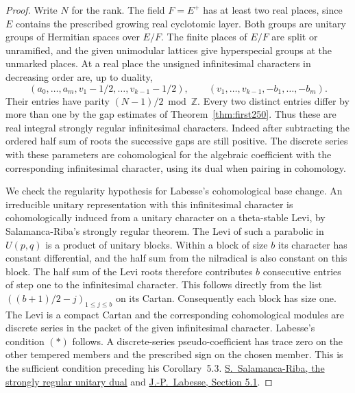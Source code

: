 \documentclass[a4paper,11pt]{article}
\theoremstyle{definition}
\theoremstyle{remark}
\newcommand{\ZZ}{\mathbb Z}\newcommand{\ord}{\operatorname{ord}}
\numberwithin{equation}{section}
\begin{document}
\begin{proof}
Write \(N\) for the rank. The field \(F=E^+\) has at least two
real places, since \(E\) contains the prescribed growing real
cyclotomic layer. Both groups are unitary groups of Hermitian
spaces over \(E/F\). The finite places of \(E/F\) are split or
unramified, and the given unimodular lattices give hyperspecial
groups at the unmarked places. At a real place the unsigned
infinitesimal characters in decreasing order are, up to duality,
\[
 (a_0,\ldots,a_m,v_1-1/2,\ldots,v_{k-1}-1/2),\qquad
 (v_1,\ldots,v_{k-1},-b_1,\ldots,-b_m).
\]
Their entries have parity \((N-1)/2\bmod\ZZ\). Every two distinct
entries differ by more than one by the gap estimates of
Theorem~\ref{thm:first250}. Thus these are real integral strongly
regular infinitesimal characters. Indeed after subtracting the
ordered half sum of roots the successive gaps are still positive.
The discrete series with these parameters are cohomological for
the algebraic coefficient with the corresponding infinitesimal
character, using its dual when pairing in cohomology.

We check the regularity hypothesis for Labesse's cohomological
base change. An irreducible unitary representation with this
infinitesimal character is cohomologically induced from a unitary
character on a theta-stable Levi, by Salamanca-Riba's strongly
regular theorem. The Levi of such a parabolic in \(U(p,q)\) is
a product of unitary blocks. Within a block of size \(b\) its
character has constant differential, and the half sum from the
nilradical is also constant on this block. The half sum of the
Levi roots therefore contributes \(b\) consecutive entries of
step one to the infinitesimal character. This follows directly
from the list \(((b+1)/2-j)_{1\le j\le b}\) on its Cartan.
Consequently each block has size one. The Levi is a compact
Cartan and the corresponding cohomological modules are discrete
series in the packet of the given infinitesimal character.
Labesse's condition \((*)\) follows. A discrete-series
pseudo-coefficient has trace zero on the other tempered members
and the prescribed sign on the chosen member. This is the
sufficient condition preceding his Corollary~5.3.
\href{https://doi.org/10.1215/S0012-7094-99-09616-3}{S.~Salamanca-Riba,
the strongly regular unitary dual} and
\href{https://webusers.imj-prg.fr/~michael.harris/CBCM.pdf}
{J.-P.~Labesse, Section 5.1}.


\end{proof}
\end{document}
